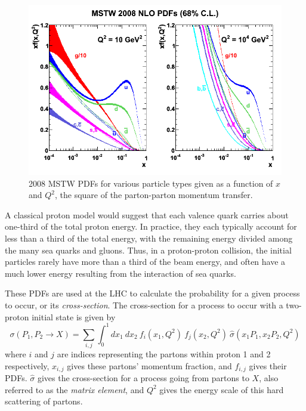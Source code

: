 \begin{centering}
\begin{figure}[bth]
\myfloatalign
\includegraphics[width=.85\linewidth]{figures/theory/mstw2008nlo68cl_allpdfs.png}
\caption{2008 MSTW \acp{PDF} for various particle types given as a function of $x$ and $Q^2$, the square of the parton-parton momentum transfer. \cite{0901.0002}}
\label{fig:pdf}
\end{figure}
\end{centering}

A classical proton model would suggest that each valence quark carries about one-third of the total proton energy. In practice, they each typically account for less than a third of the total energy, with the remaining energy divided among the many sea quarks and gluons. Thus, in a proton-proton collision, the initial particles rarely have more than a third of the beam energy, and often have a much lower energy resulting from the interaction of sea quarks. 

These \acp{PDF} are used at the \ac{LHC} to calculate the probability for a given process to occur, or its \textit{cross-section}. The cross-section for a process to occur with a two-proton initial state is given by 
%
\begin{equation}
\sigma(P_1, P_2 \rightarrow X) = \sum_{i,j} \int_0^1 dx_1\ dx_2\ f_i(x_1, Q^2)\ f_j(x_2, Q^2) \ \hat{\sigma}(x_1P_1, x_2P_2, Q^2 )
\end{equation}
%
where $i$ and $j$ are indices representing the partons within proton 1 and 2 respectively, $x_{i,j}$ gives these partons' momentum fraction, and $f_{i,j}$ gives their \acp{PDF}. $\hat{\sigma}$ gives the cross-section for a process going from partons to $X$, also referred to as the \textit{matrix element}, and $Q^2$ gives the energy scale of this hard scattering of partons. 

